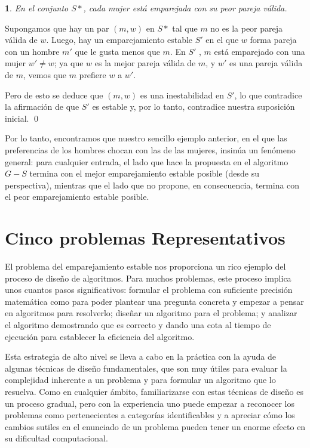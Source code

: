 \documentclass[a4paper, 12pt]{book}
\theoremstyle{dotless}
\newtheorem{theorem}{}[section]
\renewenvironment{proof}{\vspace{12pt}{\noindent\bfseries Demostración.}}{\qed\vspace{12pt}}
\begin{document}
\vspace{2mm}
\begin{theorem}
En el conjunto $S*$, cada mujer está emparejada con su peor pareja válida.
\end{theorem}
\vspace{2mm}

\begin{proof}
Supongamos que hay un par $(m, w)$ en $S*$ tal que $m$ no es la peor pareja válida de $w$. Luego, hay un emparejamiento estable $S'$ en el que $w$ forma pareja con un hombre $m'$ que le gusta menos que $m$. En $S'$ , $m$ está emparejado con una mujer $w'\neq w$; ya que $w$ es la mejor pareja válida de $m$, y $w'$ es una pareja válida de $m$, vemos que $m$ prefiere $w$ a $w'$.

Pero de esto se deduce que $(m, w)$ es una inestabilidad en $S'$, lo que contradice la afirmación de que $S'$ es estable y, por lo tanto, contradice nuestra suposición inicial.
\end{proof}

Por lo tanto, encontramos que nuestro sencillo ejemplo anterior, en el que las preferencias de los hombres chocan con las de las mujeres, insinúa un fenómeno general: para cualquier entrada, el lado que hace la propuesta en el algoritmo $G-S$ termina con el mejor emparejamiento estable posible (desde su perspectiva), mientras que el lado que no propone, en consecuencia, termina con el peor emparejamiento estable posible.

\section{Cinco problemas Representativos}
\label{sec:cincoproblemasrep}

El problema del emparejamiento estable nos proporciona un rico ejemplo del proceso de diseño de algoritmos. Para muchos problemas, este proceso implica unos cuantos pasos significativos: formular el problema con suficiente precisión matemática como para poder plantear una pregunta concreta y empezar a pensar en algoritmos para resolverlo; diseñar un algoritmo para el problema; y analizar el algoritmo demostrando que es correcto y dando una cota al tiempo de ejecución para establecer la eficiencia del algoritmo.

Esta estrategia de alto nivel se lleva a cabo en la práctica con la ayuda de algunas técnicas de diseño fundamentales, que son muy útiles para evaluar la complejidad inherente a un problema y para formular un algoritmo que lo resuelva. Como en cualquier ámbito, familiarizarse con estas técnicas de diseño es un proceso gradual, pero con la experiencia uno puede empezar a reconocer los problemas como pertenecientes a categorías identificables y a apreciar cómo los cambios sutiles en el enunciado de un problema pueden tener un enorme efecto en su dificultad computacional.
\end{document}
